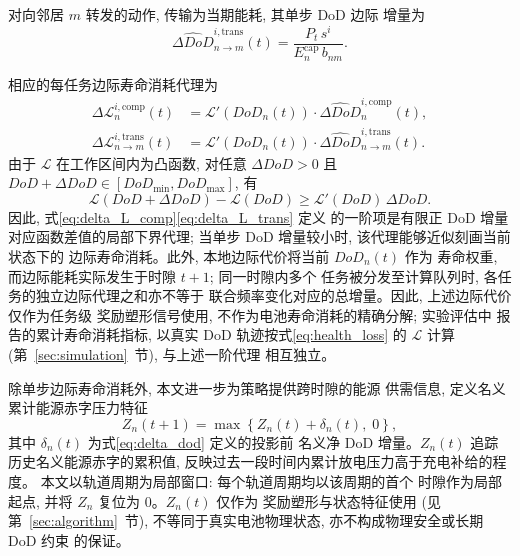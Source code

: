 \documentclass[a4paper,11pt]{article}
\begin{document}
对向邻居 $m$ 转发的动作, 传输为当期能耗, 其单步 DoD 边际
增量为
\begin{equation}
    \widehat{\Delta DoD}^{i,\mathrm{trans}}_{n \to m}(t)
    = \frac{P_t\, s^i}{E^{\mathrm{cap}}_n\, b_{nm}}.
    \label{eq:delta_dod_trans_task}
\end{equation}

相应的每任务边际寿命消耗代理为
\begin{align}
    \Delta\mathcal{L}^{i,\mathrm{comp}}_n(t)
    &= \mathcal{L}'(DoD_n(t)) \cdot 
    \widehat{\Delta DoD}^{i,\mathrm{comp}}_n(t),
    \label{eq:delta_L_comp}\\
    \Delta\mathcal{L}^{i,\mathrm{trans}}_{n \to m}(t)
    &= \mathcal{L}'(DoD_n(t)) \cdot 
    \widehat{\Delta DoD}^{i,\mathrm{trans}}_{n \to m}(t).
    \label{eq:delta_L_trans}
\end{align}
由于 $\mathcal{L}$ 在工作区间内为凸函数, 对任意
$\Delta DoD > 0$ 且 $DoD + \Delta DoD \in [DoD_{\min}, DoD_{\max}]$,
有
\begin{equation}
    \mathcal{L}(DoD + \Delta DoD) - \mathcal{L}(DoD)
    \ge \mathcal{L}'(DoD)\, \Delta DoD.
    \label{eq:convex_lower_bound}
\end{equation}
因此, 式\eqref{eq:delta_L_comp}\eqref{eq:delta_L_trans} 定义
的一阶项是有限正 DoD 增量对应函数差值的局部下界代理; 
当单步 DoD 增量较小时, 该代理能够近似刻画当前状态下的
边际寿命消耗。此外, 本地边际代价将当前 $DoD_n(t)$ 作为
寿命权重, 而边际能耗实际发生于时隙 $t+1$; 同一时隙内多个
任务被分发至计算队列时, 各任务的独立边际代理之和亦不等于
联合频率变化对应的总增量。因此, 上述边际代价仅作为任务级
奖励塑形信号使用, 不作为电池寿命消耗的精确分解; 实验评估中
报告的累计寿命消耗指标, 以真实 DoD 轨迹按式\eqref{eq:health_loss}
的 $\mathcal{L}$ 计算 (第~\ref{sec:simulation}~节), 与上述一阶代理
相互独立。

除单步边际寿命消耗外, 本文进一步为策略提供跨时隙的能源
供需信息, 定义名义累计能源赤字压力特征
\begin{equation}
    Z_n(t+1) = \max\left\{Z_n(t) + \delta_n(t),\; 0\right\},
    \label{eq:virtual_queue}
\end{equation}
其中 $\delta_n(t)$ 为式\eqref{eq:delta_dod} 定义的投影前
名义净 DoD 增量。$Z_n(t)$ 追踪历史名义能源赤字的累积值,
反映过去一段时间内累计放电压力高于充电补给的程度。
本文以轨道周期为局部窗口: 每个轨道周期均以该周期的首个
时隙作为局部起点, 并将 $Z_n$ 复位为 $0$。$Z_n(t)$ 仅作为
奖励塑形与状态特征使用 (见第~\ref{sec:algorithm}~节),
不等同于真实电池物理状态, 亦不构成物理安全或长期 DoD 约束
的保证。
\end{document}
